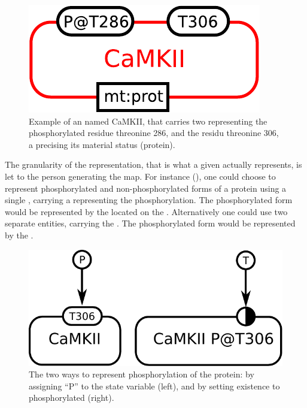 
\begin{figure}[H]
  \centering
  \includegraphics[scale = 0.5]{examples/ex-entity}
  \caption{Example of an  named CaMKII, that carries two  representing the phosphorylated residue threonine 286, and the residu threonine 306, a  precising its material status (protein).}
  \label{fig:ex-entity}
\end{figure}

The granularity of the representation, that is what a given  actually represents, is let to the person generating the map. For instance (), one could choose to represent phosphorylated and non-phosphorylated forms of a protein using a single , carrying a  representing the phosphorylation. The phosphorylated form would be represented by the  located on the . Alternatively one could use two separate entities, carrying the  . The phosphorylated form would be represented by the .

\begin{figure}[H]
  \centering
  \includegraphics[scale = 0.5]{images/entity-granularity}
  \caption{The two ways to represent phosphorylation of the protein: by assigning ``P'' to the state variable (left), and by setting existence to phosphorylated  (right).}
  \label{fig:entity-granularity}
\end{figure}

